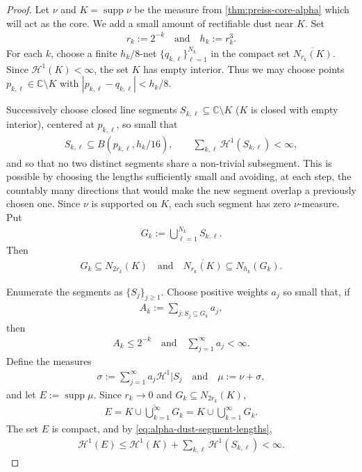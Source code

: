 \documentclass[11pt,a4paper,english,reqno]{amsart}
\newcommand{\hd}[1]{\mathcal{H}^{#1}}
\numberwithin{equation}{section}
\newcommand{\CC}[0]{\mathbb{C}}
\renewcommand{\subset}{\subseteq}
\DeclareMathOperator{\supp}{supp}
\renewcommand{\restriction}{\big|}
\numberwithin{definition}{section}
\begin{document}
\begin{proof}
  Let $\nu$ and $K=\supp\nu$ be the measure from \cref{thm:preiss-core-alpha} which will act as the core.
  We add a small amount of rectifiable dust near $K$.  Set
  \begin{align}
    r_k:=2^{-k}\quad\text{and}\quad h_k:=r_k^3 .
  \end{align}
  For each $k$, choose a finite $h_k/8$-net $\{q_{k,\ell}\}_{\ell=1}^{N_k}$ in the compact set $\overline{N_{r_k}(K)}$.  Since $\hd1(K)<\infty$, the set $K$ has empty interior.  Thus we may choose points $p_{k,\ell}\in\CC\setminus K$ with $|p_{k,\ell}-q_{k,\ell}|<h_k/8$.

  Successively choose closed line segments $S_{k,\ell}\subset\CC\setminus K$ ($K$ is closed with empty interior), centered at $p_{k,\ell}$, so small that
  \begin{align}\label{eq:alpha-dust-segment-lengths}
    S_{k,\ell}\subset B(p_{k,\ell},h_k/16),
    \qquad
    \sum_{k,\ell}\hd1(S_{k,\ell})<\infty,
  \end{align}
  and so that no two distinct segments share a non-trivial subsegment.  This is possible by choosing the lengths sufficiently small and avoiding, at each step, the countably many directions that would make the new segment overlap a previously chosen one.  Since $\nu$ is supported on $K$, each such segment has zero $\nu$-measure.  Put
  \begin{align}
    G_k:=\bigcup_{\ell=1}^{N_k}S_{k,\ell} .
  \end{align}
  Then
  \begin{align}\label{eq:alpha-dust-net-properties}
    G_k\subset N_{2r_k}(K)
    \quad\text{and}\quad
    \overline{N_{r_k}(K)}\subset N_{h_k}(G_k).
  \end{align}

  Enumerate the segments as $\{S_j\}_{j\ge1}$.  Choose positive weights $a_j$ so small that, if
  \begin{align}
    A_k:=\sum_{j:S_j\subset G_k} a_j,
  \end{align}
  then
  \begin{align}\label{eq:alpha-dust-weight-choice}
    A_k\le 2^{-k}
    \quad\text{and}\quad
    \sum_{j=1}^\infty a_j<\infty .
  \end{align}
  Define the measures
  \begin{align}
    \sigma:=\sum_{j=1}^\infty a_j\hd1\restriction{S_j}
    \quad\text{and}\quad
    \mu:=\nu+\sigma,
  \end{align}
  and let $E:=\supp\mu$.  Since $r_k\to0$ and $G_k\subset N_{2r_k}(K)$,
  \begin{align}\label{eq:alpha-dust-support}
    E
    = \overline{ K\cup\bigcup_{k=1}^\infty G_k  }
    =K\cup\bigcup_{k=1}^\infty G_k .
  \end{align}
  The set $E$ is compact, and by \cref{eq:alpha-dust-segment-lengths},
  \begin{align}
    \hd1(E)\le \hd1(K)+\sum_{k,\ell}\hd1(S_{k,\ell})<\infty .
  \end{align}


\end{proof}
\end{document}
